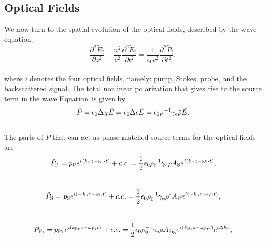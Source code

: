 \subsection{Optical Fields}
\label{Coupled-Wave Equations:Optical Fields}

We now turn to the spatial evolution of the optical fields, described by the wave equation,
\\
\begin{equation}
    \frac{\partial^{2}\tilde{E}_{i}}{\partial z^{2}} - \frac{n^{2}}{c^{2}}\frac{\partial^{2}\tilde{E}_{i}}{\partial t^{2}} = \frac{1}{\epsilon_{0}c^{2}}\frac{\partial^{2}\tilde{P}_{i}}{\partial t^{2}},
    \label{eq:Wave equation}
\end{equation}
\\
where \(i\) denotes the four optical fields, namely: pump, Stokes, probe, and the backscattered signal. The total nonlinear polarization that gives rise to the source term in the wave Equation~is given by
\\
\begin{equation}
    \tilde{P} = \epsilon_{0}\Delta\chi\tilde{E} = \epsilon_{0}\Delta\epsilon\tilde{E} = \epsilon_{0}\rho^{-1}\gamma_{\rm e}\tilde{\rho}\tilde{E}.
\end{equation}
\\
The parts of \(\tilde{P}\) that can act as phase-matched source terms for the optical fields are
\\
\begin{equation}
    \tilde{P}_{\rm P} = p_{\rm P}e^{i(k_{\rm P}z - \omega_{\rm P} t)} + c.c. = \frac{1}{2}\epsilon_{0}\rho_{0}^{-1}\gamma_{\rm e}\rho A_{\rm S}e^{i(k_{\rm P}z - \omega_{\rm P} t)},
    \label{eq:Pump phase-matched source term}
\end{equation}
\\
\begin{equation}
    \tilde{P}_{\rm S} = p_{\rm S}e^{i(-k_{\rm S}z - \omega_{\rm S} t)} + c.c. = \frac{1}{2}\epsilon_{0}\rho_{0}^{-1}\gamma_{\rm e}\rho^{*} A_{\rm P}e^{i(-k_{\rm S}z - \omega_{\rm S} t)},
    \label{eq:Stokes phase-matched source term}
\end{equation}
\\
\begin{equation}
    \tilde{P}_{\rm Pr} = p_{\rm Pr}e^{i(k_{\rm Pr}z - \omega_{\rm Pr} t)} + c.c. = \frac{1}{2}\epsilon_{0}\rho_{0}^{-1}\gamma_{\rm e}\rho A_{\rm Sig}e^{i(k_{\rm Pr}z - \omega_{\rm Pr} t)}e^{i\Delta kz},
    \label{eq:Probe phase-matched source term}
\end{equation}
